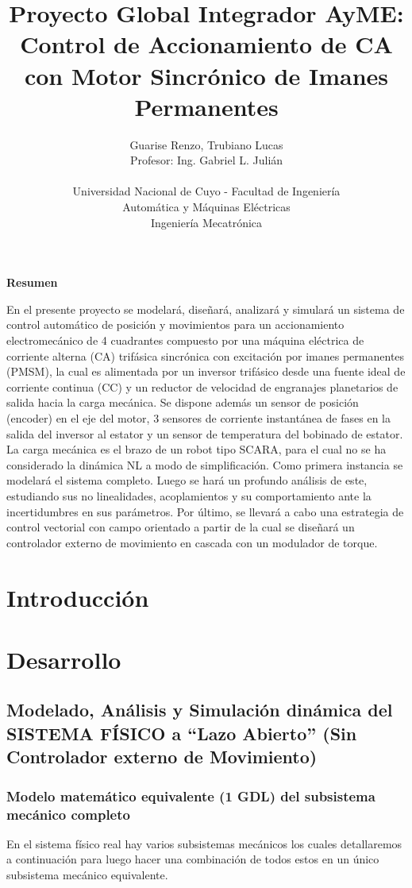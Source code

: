 \documentclass[10pt]{article}
\title{Proyecto Global Integrador AyME:\\
Control de Accionamiento de CA con Motor Sincrónico de Imanes Permanentes}
\author{Guarise Renzo, Trubiano Lucas\\
Profesor: Ing. Gabriel L. Julián\\
\\
Universidad Nacional de Cuyo - Facultad de Ingeniería\\
Automática y Máquinas Eléctricas\\
Ingeniería Mecatrónica}
\begin{document}
\maketitle

\begin{center} %
    {\Large \textbf{Resumen}}
\end{center}

En el presente proyecto se modelará, diseñará, analizará y simulará un sistema de control automático de posición y movimientos para un accionamiento electromecánico de 4 cuadrantes compuesto por una máquina eléctrica de corriente alterna (CA) trifásica sincrónica con excitación por imanes permanentes (PMSM), la cual es alimentada por un inversor trifásico desde una fuente ideal de corriente continua (CC) y un reductor de velocidad de engranajes planetarios de salida hacia la carga mecánica. Se dispone además un sensor de posición (encoder) en el eje del motor, 3 sensores de corriente instantánea de fases en la salida del inversor al estator y un sensor de temperatura del bobinado de estator. La carga mecánica es el brazo de un robot tipo SCARA, para el cual no se ha considerado la dinámica NL a modo de simplificación. Como primera instancia se modelará el sistema completo. Luego se hará un profundo análisis de este, estudiando sus no linealidades, acoplamientos y su comportamiento ante la incertidumbres en sus parámetros. Por último, se llevará a cabo una estrategia de control vectorial con campo orientado a partir de la cual se diseñará un controlador externo de movimiento en cascada con un modulador de torque.



\section{Introducción}


\section{Desarrollo}
\subsection{Modelado, Análisis y Simulación dinámica del SISTEMA FÍSICO a “Lazo Abierto” (Sin Controlador externo de Movimiento)}
\subsubsection{Modelo matemático equivalente (1 GDL) del subsistema mecánico completo}
En el sistema físico real hay varios subsistemas mecánicos los cuales detallaremos a continuación para luego hacer una combinación de todos estos en un único subsistema mecánico equivalente.
\end{document}
